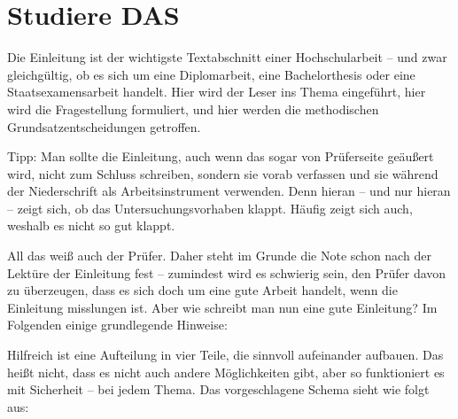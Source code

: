 \section*{Studiere DAS} 
Die Einleitung ist der wichtigste Textabschnitt einer Hochschularbeit – und zwar gleichgültig, ob es sich um eine Diplomarbeit,
eine Bachelorthesis oder eine Staatsexamensarbeit handelt. Hier wird der Leser ins Thema eingeführt, hier wird die Fragestellung
formuliert, und hier werden die methodischen Grundsatzentscheidungen getroffen.

Tipp: Man sollte die Einleitung, auch wenn das sogar von Prüferseite geäußert wird, nicht zum Schluss schreiben, sondern sie vorab
verfassen und sie während der Niederschrift als Arbeitsinstrument verwenden. Denn hieran – und nur hieran – zeigt sich, ob das
Untersuchungsvorhaben klappt. Häufig zeigt sich auch, weshalb es nicht so gut klappt.

All das weiß auch der Prüfer. Daher steht im Grunde die Note schon nach der Lektüre der Einleitung fest – zumindest wird es
schwierig sein, den Prüfer davon zu überzeugen, dass es sich doch um eine gute Arbeit handelt, wenn die Einleitung misslungen ist.
Aber wie schreibt man nun eine gute Einleitung? Im Folgenden einige grundlegende Hinweise:

Hilfreich ist eine Aufteilung in vier Teile, die sinnvoll aufeinander aufbauen. Das heißt nicht, dass es nicht auch andere
Möglichkeiten gibt, aber so funktioniert es mit Sicherheit – bei jedem Thema.  Das vorgeschlagene Schema sieht wie folgt aus:

